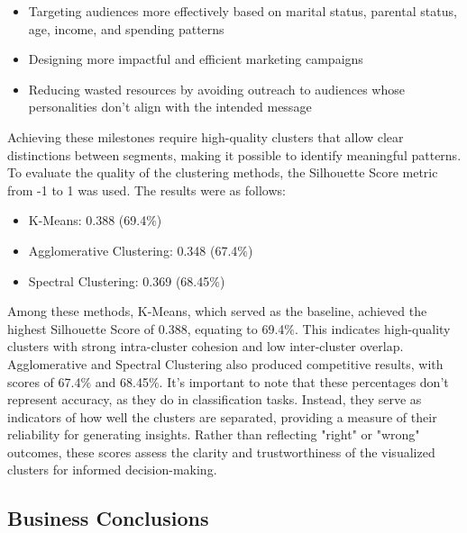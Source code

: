 \documentclass[11pt]{article}
\begin{document}
\begin{itemize}
	\item Targeting audiences more effectively based on marital status, parental status, age, income, and spending patterns

	\item Designing more impactful and efficient marketing campaigns

	\item Reducing wasted resources by avoiding outreach to audiences whose personalities don’t align with the intended message

\end{itemize}
\vspace{1\baselineskip}
Achieving these milestones require high-quality clusters that allow clear distinctions between segments, making it possible to identify meaningful patterns. To evaluate the quality of the clustering methods, the Silhouette Score metric from -1 to 1 was used. The results were as follows:

\begin{itemize}
	\item K-Means: 0.388 (69.4$\%$)

	\item Agglomerative Clustering: 0.348 (67.4$\%$)

	\item Spectral Clustering: 0.369 (68.45$\%$)

\end{itemize}
\vspace{1\baselineskip}
Among these methods, K-Means, which served as the baseline, achieved the highest Silhouette Score of 0.388, equating to 69.4$\%$. This indicates high-quality clusters with strong intra-cluster cohesion and low inter-cluster overlap. Agglomerative and Spectral Clustering also produced competitive results, with scores of 67.4$\%$ and 68.45$\%$. It’s important to note that these percentages don’t represent accuracy, as they do in classification tasks. Instead, they serve as indicators of how well the clusters are separated, providing a measure of their reliability for generating insights. Rather than reflecting "right" or "wrong" outcomes, these scores assess the clarity and trustworthiness of the visualized clusters for informed decision-making.

\vspace{1\baselineskip}
\subsection{Business Conclusions}
\end{document}
